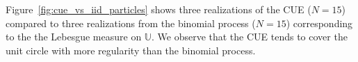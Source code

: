 \documentclass[twoside,11pt]{book}
\numberwithin{theorem}{chapter}
\numberwithin{definition}{chapter}
\numberwithin{proposition}{chapter}
\numberwithin{corollary}{chapter}
\numberwithin{example}{chapter}
\numberwithin{lemma}{chapter}
\numberwithin{assumption}{chapter}
\begin{document}
Figure~\ref{fig:cue_vs_iid_particles} shows three realizations of the CUE ($N = 15$) compared to three realizations from the binomial process ($N = 15$) corresponding to the the Lebesgue measure on $\mathbb{U}$. We observe that the CUE tends to cover the unit circle with more regularity than the binomial process.




\end{document}
